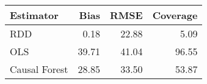 \begin{table}[ht]
\centering
\begin{tabular}{lrrr}
  \hline
Estimator & Bias & RMSE & Coverage \\ 
  \hline
RDD & 0.18 & 22.88 & 5.09 \\ 
  OLS & 39.71 & 41.04 & 96.55 \\ 
  Causal Forest & 28.85 & 33.50 & 53.87 \\ 
   \hline
\end{tabular}
\end{table}
